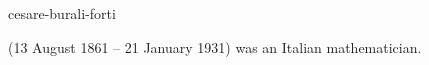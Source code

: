 \documentclass{stex}
\begin{document}
\begin{smodule}{cesare-burali-forti}
\begin{sparagraph}[style=symdoc]
   (13 August 1861 – 21 January 1931) was an Italian mathematician.
\end{sparagraph}
\end{smodule}
\end{document}
